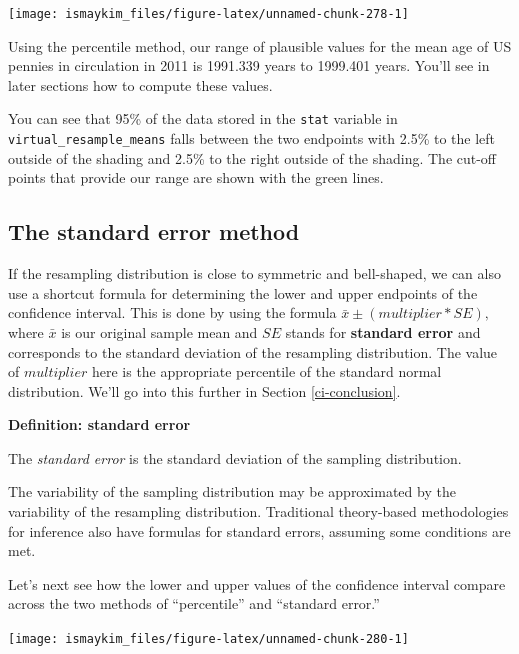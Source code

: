 \documentclass[12pt, krantz2,]{krantz}
\begin{document}
\begin{center}\texttt{[image: ismaykim\_files/figure-latex/unnamed-chunk-278-1]} \end{center}

Using the percentile method, our range of plausible values for the mean age of US pennies in circulation in 2011 is 1991.339 years to 1999.401 years. You'll see in later sections how to compute these values.

You can see that 95\% of the data stored in the \texttt{stat} variable in \texttt{virtual\_resample\_means} falls between the two endpoints with 2.5\% to the left outside of the shading and 2.5\% to the right outside of the shading. The cut-off points that provide our range are shown with the green lines.

\hypertarget{the-standard-error-method}{%
\subsection{The standard error method}\label{the-standard-error-method}}

If the resampling distribution is close to symmetric and bell-shaped, we can also use a shortcut formula for determining the lower and upper endpoints of the confidence interval. This is done by using the formula \(\bar{x} \pm (multiplier * SE),\) where \(\bar{x}\) is our original sample mean and \(SE\) stands for \textbf{standard error} and corresponds to the standard deviation of the resampling distribution. The value of \(multiplier\) here is the appropriate percentile of the standard normal distribution. We'll go into this further in Section \ref{ci-conclusion}.

\textbf{Definition: standard error}

The \emph{standard error} is the standard deviation of the sampling distribution.

The variability of the sampling distribution may be approximated by the variability of the resampling distribution. Traditional theory-based methodologies for inference also have formulas for standard errors, assuming some conditions are met.

Let's next see how the lower and upper values of the confidence interval compare across the two methods of ``percentile'' and ``standard error.''

\begin{center}\texttt{[image: ismaykim\_files/figure-latex/unnamed-chunk-280-1]} \end{center}
\end{document}
